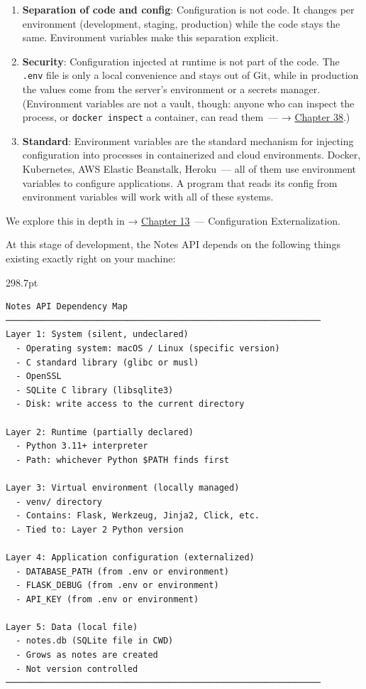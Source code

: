 \begin{enumerate}
\def\labelenumi{\arabic{enumi}.}
\item
  \textbf{Separation of code and config}: Configuration is not code. It changes per environment (development, staging, production) while the code stays the same. Environment variables make this separation explicit.
\item
  \textbf{Security}: Configuration injected at runtime is not part of the code. The \texttt{.env} file is only a local convenience and stays out of Git, while in production the values come from the server's environment or a secrets manager. (Environment variables are not a vault, though: anyone who can inspect the process, or \texttt{docker\ inspect} a container, can read them~--- → \hyperref[ch:38-security]{Chapter 38}.)
\item
  \textbf{Standard}: Environment variables are the standard mechanism for injecting configuration into processes in containerized and cloud environments. Docker, Kubernetes, AWS Elastic Beanstalk, Heroku~--- all of them use environment variables to configure applications. A program that reads its config from environment variables will work with all of these systems.
\end{enumerate}

\noindent{}We explore this in depth in → \hyperref[ch:13-configuration-externalization]{Chapter 13}~--- Configuration Externalization.

\label{06-local-dependencies:the-full-dependency-map-of-the-notes-api}

At this stage of development, the Notes API depends on the following things existing exactly right on your machine:

\begin{diagrambox}[short]{298.7pt}
\begin{Verbatim}[fontsize=\fontsize{9.0}{8.55}\selectfont]
Notes API Dependency Map
──────────────────────────────────────────────────────────────
Layer 1: System (silent, undeclared)
  - Operating system: macOS / Linux (specific version)
  - C standard library (glibc or musl)
  - OpenSSL
  - SQLite C library (libsqlite3)
  - Disk: write access to the current directory

Layer 2: Runtime (partially declared)
  - Python 3.11+ interpreter
  - Path: whichever Python $PATH finds first

Layer 3: Virtual environment (locally managed)
  - venv/ directory
  - Contains: Flask, Werkzeug, Jinja2, Click, etc.
  - Tied to: Layer 2 Python version

Layer 4: Application configuration (externalized)
  - DATABASE_PATH (from .env or environment)
  - FLASK_DEBUG (from .env or environment)
  - API_KEY (from .env or environment)

Layer 5: Data (local file)
  - notes.db (SQLite file in CWD)
  - Grows as notes are created
  - Not version controlled
──────────────────────────────────────────────────────────────
\end{Verbatim}
\end{diagrambox}

